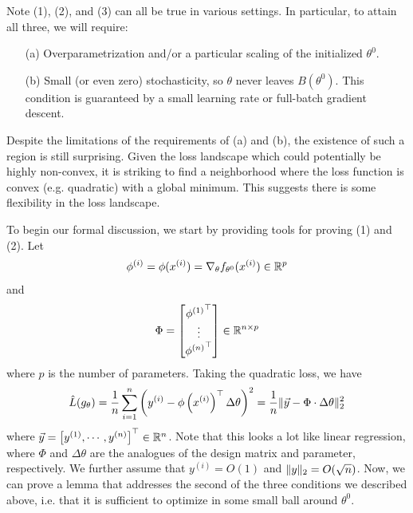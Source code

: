 Note (1), (2), and (3) can all be true in various settings. In particular, to attain all three, we will require: 
\begin{enumerate}[label=\alph*]
    \item[(a)] Overparametrization and/or a particular scaling of the initialized $\theta^0$. 
    \item[(b)] Small (or even zero) stochasticity, so $\theta$ never leaves $B(\theta^0)$. This condition is guaranteed by a small learning rate or full-batch gradient descent. 
\end{enumerate} 
Despite the limitations of the requirements of (a) and (b), the existence of such a region is still surprising. Given the loss landscape which could potentially be highly non-convex, it is striking to find a neighborhood where the loss function is convex (e.g. quadratic) with a global minimum. This suggests there is some flexibility in the loss landscape.  

To begin our formal discussion, we  start by providing tools for proving (1) and (2). Let 
\begin{align}
    \phi^{(i)} = \phi(x^{(i)}) = \nabla_\theta f_{\theta^0}( x^{(i)}) \in \mathbb R^p
\end{align}
and 
\begin{align}
    \Phi = \begin{bmatrix} {\phi^{(1)}}^\top \\ \vdots \\ {\phi^{(n)}}^\top \end{bmatrix} \in \mathbb R^{n \times p}
\end{align}
where $p$ is the number of parameters. Taking the quadratic loss, we have
\begin{align}
    \hat{L}(g_\theta) = \frac{1}{n}\sum_{i=1}^n \left( y^{(i)} - \phi\left(x^{(i)} \right)^\top \Delta \theta \right)^2 = \frac{1}{n} \|\vec{y} - \Phi \cdot \Delta \theta\|_2^2
\end{align} 
where $\vec{y} = \left[ y^{(1)}, \cdots, y^{(n)} \right]^\top \in \mathbb R^n$. Note that this looks a lot like linear regression, where $\Phi$ and $\Delta \theta$ are the analogues of the design matrix and parameter, respectively. We further assume that $y^{(i)} = O(1)$ and $\|y\|_2 = O(\sqrt{n})$. Now, we can prove a lemma that addresses the second of the three conditions we described above, i.e. that it is sufficient to optimize in some small ball around $\theta^0$.

